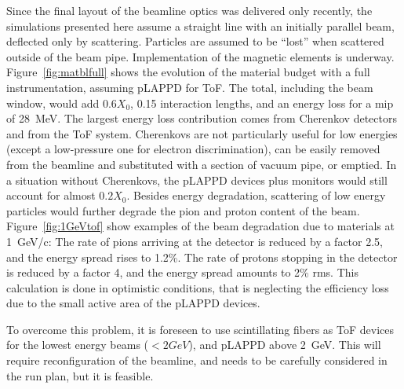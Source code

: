 Since the final layout of the beamline optics was delivered only recently, the simulations presented here assume a straight line with an initially parallel beam, deflected only by scattering. Particles are assumed to be ``lost'' when scattered outside of the beam pipe. Implementation of the magnetic elements is underway.
 Figure~\ref{fig:matblfull} shows the evolution of the material budget with a full instrumentation, assuming pLAPPD for ToF. The total, including the beam window, would add $0.6X_0$, 0.15 interaction lengths, and an energy loss for a mip of 28~MeV.
The largest energy loss contribution comes from Cherenkov detectors and from the  ToF system. Cherenkovs are not particularly useful for low energies (except a low-pressure one for electron discrimination), can be easily removed from the beamline and substituted with a section of vacuum pipe, or emptied.  
In a situation without Cherenkovs, the pLAPPD devices plus monitors would still account for almost  $0.2X_0$. Besides energy degradation, scattering of low energy particles would  further degrade the pion and proton content of the beam.  Figure~\ref{fig:1GeVtof} show examples of the beam degradation due to materials at 1~GeV/c: The rate of pions arriving at the detector is reduced by a factor 2.5, and the energy spread rises to 1.2\%. The rate of protons stopping in the detector is reduced by a factor 4, and the energy spread amounts to 2\% rms. This calculation is done in optimistic conditions, that is neglecting the efficiency loss due to the small active area of the pLAPPD devices.

To overcome this problem, it is foreseen to   use  scintillating fibers as ToF devices for the lowest energy beams ($< 2 GeV$), and pLAPPD above 2~GeV.
   This will require reconfiguration of the beamline, and needs to be carefully considered in the run plan, but it is feasible.  
 


